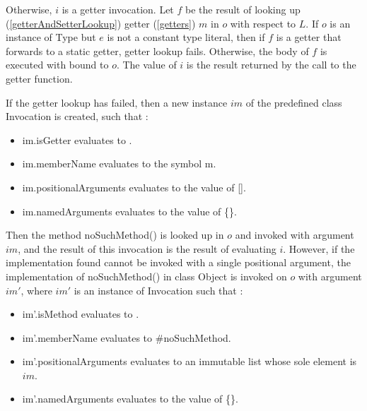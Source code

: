 \documentclass{article}
\newcommand{\code}[1]{{\sf #1}}
\begin{document}

\LMHash{}
Otherwise, $i$ is a getter invocation.  Let $f$ be the result of looking up
(\ref{getterAndSetterLookup}) getter (\ref{getters}) $m$ in $o$  with respect to $L$. If $o$ is an instance of \code{Type} but $e$ is not a constant type literal, then if $f$ is a getter that forwards  to a static getter,  getter lookup fails. Otherwise, the body of $f$ is executed with \THIS{} bound to $o$.  The value of $i$ is the result returned by the call to the getter function. 

\LMHash{}
If the getter lookup has failed, then a new instance $im$  of the predefined class  \code{Invocation}  is created, such that :
\begin{itemize}
\item  \code{im.isGetter} evaluates to \code{\TRUE{}}.
\item  \code{im.memberName} evaluates to the symbol \code{m}.
\item \code{im.positionalArguments} evaluates to the value of \code{\CONST{} []}.
\item \code{im.namedArguments} evaluates to the value of \code{\CONST{} \{\}}.
\end{itemize}
Then the method \code{noSuchMethod()} is looked up in $o$ and invoked  with argument $im$, and the result of this invocation is the result of evaluating $i$. However, if the implementation found cannot be invoked with a single positional argument, the implementation  of \code{noSuchMethod()} in class \code{Object} is invoked on $o$ with argument $im'$, where $im'$ is an instance of \code{Invocation} such that :
\begin{itemize}
\item  \code{im'.isMethod} evaluates to \code{\TRUE{}}.
\item  \code{im'.memberName} evaluates to \code{\#noSuchMethod}.
\item \code{im'.positionalArguments} evaluates to an immutable list whose sole element is  $im$.
\item \code{im'.namedArguments} evaluates to the value of \code{\CONST{} \{\}}.
\end{itemize}
\end{document}

